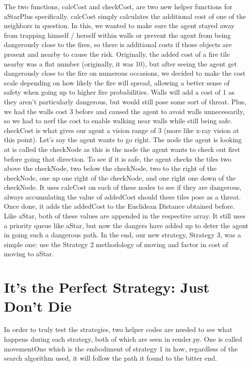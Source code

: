 \documentclass[11pt]{article}
\begin{document}
The two functions, calcCost and checkCost, are two new helper functions for aStarPlus specifically. calcCost simply calculates the additional cost of one of the neighbors in question. In this, we wanted to make sure the agent stayed away from trapping himself / herself within walls or prevent the agent from being dangerously close to the fires, so there is additional costs if those objects are present and nearby to cause the risk. Originally, the added cost of a fire tile nearby was a flat number (originally, it was 10), but after seeing the agent get dangerously close to the fire on numerous occasions, we decided to make the cost scale depending on how likely the fire will spread, allowing a better sense of safety when going up to higher fire probabilities. Walls will add a cost of 1 as they aren't particularly dangerous, but would still pose some sort of threat. Plus, we had the walls cost 3 before and caused the agent to avoid walls unnecessarily, so we had to nerf the cost to enable walking near walls while still being safe.
checkCost is what gives our agent a vision range of 3 (more like x-ray vision at this point). Let's say the agent wants to go right. The node the agent is looking at is called the checkNode as this is the node the agent wants to check out first before going that direction. To see if it is safe, the agent checks the tiles two above the checkNode, two below the checkNode, two to the right of the checkNode, one up one right of the checkNode, and one right one down of the checkNode. It uses calcCost on each of these nodes to see if they are dangerous, always accumulating the value of addedCost should these tiles pose as a threat. Once done, it adds the addedCost to the Euclidean Distance obtained before. Like aStar, both of these values are appended in the respective array. It still uses a priority queue like aStar, but now the dangers have added up to deter the agent in going such a dangerous path.
In the end, our new strategy, Strategy 3, was a simple one: use the Strategy 2 methodology of moving and factor in cost of moving to aStar.

	\pagebreak
\section{It's the Perfect Strategy: Just Don't Die}
In order to truly test the strategies, two helper codes are needed to see what happens during each strategy, both of which are seen in render.py. One is called movementOne which is the embodiment of strategy 1 in how, regardless of the search algorithm used, it will follow the path it found to the bitter end.
\end{document}
